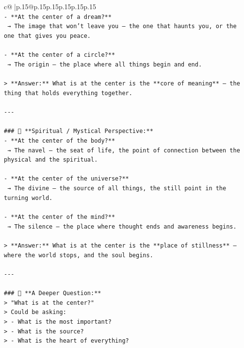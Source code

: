 \documentclass{article}
\begin{document}
{\begin{supertabular}{c@{$\;$}|p{.15\linewidth}@{}p{.15\linewidth}p{.15\linewidth}p{.15\linewidth}p{.15\linewidth}p{.15\linewidth}}
{{{\\ 
\texttt{{-} **At the center of a dream?**  } \\
\texttt{  → The image that won’t leave you — the one that haunts you, or the one that gives you peace.} \\
\\ 
\texttt{{-} **At the center of a circle?**  } \\
\texttt{  → The origin — the place where all things begin and end.} \\
\\ 
\texttt{> **Answer:** What is at the center is the **core of meaning** — the thing that holds everything together.} \\
\\ 
\texttt{{-}{-}{-}} \\
\\ 
\texttt{\#\#\# 🧩 **Spiritual / Mystical Perspective:**} \\
\texttt{{-} **At the center of the body?**  } \\
\texttt{  → The navel — the seat of life, the point of connection between the physical and the spiritual.} \\
\\ 
\texttt{{-} **At the center of the universe?**  } \\
\texttt{  → The divine — the source of all things, the still point in the turning world.} \\
\\ 
\texttt{{-} **At the center of the mind?**  } \\
\texttt{  → The silence — the place where thought ends and awareness begins.} \\
\\ 
\texttt{> **Answer:** What is at the center is the **place of stillness** — where the world stops, and the soul begins.} \\
\\ 
\texttt{{-}{-}{-}} \\
\\ 
\texttt{\#\#\# 🤔 **A Deeper Question:**} \\
\texttt{> "What is at the center?"  } \\
\texttt{> Could be asking:  } \\
\texttt{> {-} What is the most important?  } \\
\texttt{> {-} What is the source?  } \\
\texttt{> {-} What is the heart of everything?} \\
\\ 
}}}
\end{supertabular}}
\end{document}
